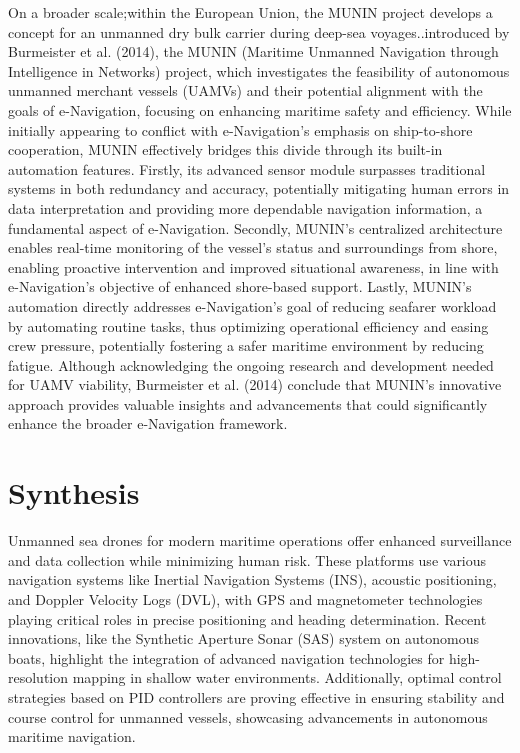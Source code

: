 \begin{itemize}
On a broader scale;within the European Union, the MUNIN project develops a concept for an unmanned dry bulk carrier 
during deep-sea voyages..introduced by Burmeister et al. (2014), the MUNIN (Maritime Unmanned Navigation through 
Intelligence in Networks)  project, which investigates the feasibility of autonomous unmanned merchant vessels (UAMVs) 
and their potential alignment with the goals of e-Navigation, focusing on enhancing maritime safety and efficiency. 
While initially appearing to conflict with e-Navigation's emphasis on ship-to-shore cooperation, MUNIN effectively 
bridges this divide through its built-in automation features. Firstly, its advanced sensor module surpasses traditional 
systems in both redundancy and accuracy, potentially mitigating human errors in data interpretation and providing more 
dependable navigation information, a fundamental aspect of e-Navigation. Secondly, MUNIN's centralized architecture 
enables real-time monitoring of the vessel's status and surroundings from shore, enabling proactive intervention and 
improved situational awareness, in line with e-Navigation's objective of enhanced shore-based support. Lastly, MUNIN's 
automation directly addresses e-Navigation's goal of reducing seafarer workload by automating routine tasks, thus 
optimizing operational efficiency and easing crew pressure, potentially fostering a safer maritime environment by 
reducing fatigue. Although acknowledging the ongoing research and development needed for UAMV viability, Burmeister 
et al. (2014) conclude that MUNIN's innovative approach provides valuable insights and advancements that could 
significantly enhance the broader e-Navigation framework.
\end{itemize}

\section{Synthesis}
Unmanned sea drones for modern maritime operations offer enhanced surveillance and data collection while minimizing human 
risk. These platforms use various navigation systems like Inertial Navigation Systems (INS), acoustic positioning, and 
Doppler Velocity Logs (DVL), with GPS and magnetometer technologies playing critical roles in precise positioning and 
heading determination. Recent innovations, like the Synthetic Aperture Sonar (SAS) system on autonomous boats, highlight 
the integration of advanced navigation technologies for high-resolution mapping in shallow water environments. 
Additionally, optimal control strategies based on PID controllers are proving effective in ensuring stability and course 
control for unmanned vessels, showcasing advancements in autonomous maritime navigation.

